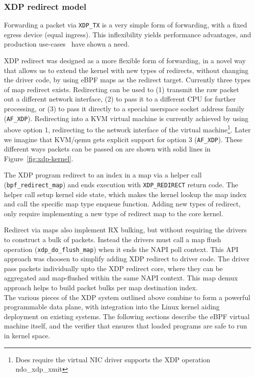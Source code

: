 \documentclass[10pt,sigconf]{acmart}
\begin{document}
\subsubsection{XDP redirect model}
\label{sec:redir}

Forwarding a packet via \texttt{XDP\_TX} is a very simple form of forwarding,
with a fixed egress device (equal ingress).  This inflexibility yields
performance advantages, and production use-cases~\cite{katran} have shown a
need.

XDP redirect was designed as a more flexible form of forwarding, in a novel way
that allows us to extend the kernel with new types of redirects, without
changing the driver code, by using eBPF maps as the redirect target.
%
Currently three types of map redirect exists.  Redirecting can be used to (1)
transmit the raw packet out a different network interface, (2) to pass it to
a different CPU for further processing, or (3) to pass it directly to a special
userspace socket address family (\texttt{AF\_XDP}).
%
Redirecting into a KVM virtual machine is currently achieved by using above
option 1, redirecting to the network interface of the virtual
machine\footnote{Does require the virtual NIC driver supports the XDP operation
  ndo\_xdp\_xmit}.  Later we imagine that KVM/qemu gets explicit support for
option 3 (\texttt{AF\_XDP}).
%
These different ways packets can be passed on are shown with solid lines in
Figure~\ref{fig:xdp-kernel}.

The XDP program redirect to an index in a map via a helper call
(\texttt{bpf\_redirect\_map}) and ends execution with \texttt{XDP\_REDIRECT}
return code. The helper call setup kernel side state, which makes the kernel
lookup the map index and call the specific map type enqueue function.  Adding
new types of redirect, only require implementing a new type of redirect map to
the core kernel.

Redirect via maps also implement RX bulking, but without requiring the drivers
to construct a bulk of packets.  Instead the drivers must call a map flush
operation (\texttt{xdp\_do\_flush\_map}) when it ends the NAPI poll context.
This API approach was choosen to simplify adding XDP redirect to driver code.
The driver pass packets individually upto the XDP redirect core, where they can
be aggregated and map-flushed within the same NAPI context.  This map demux
approach helps to build packet bulks per map destination index.
\\

The various pieces of the XDP system outlined above combine to form a powerful
programmable data plane, with integration into the Linux kernel aiding
deployment on existing systems. The following sections describe the eBPF virtual
machine itself, and the verifier that ensures that loaded programs are safe to
run in kernel space.
\end{document}
